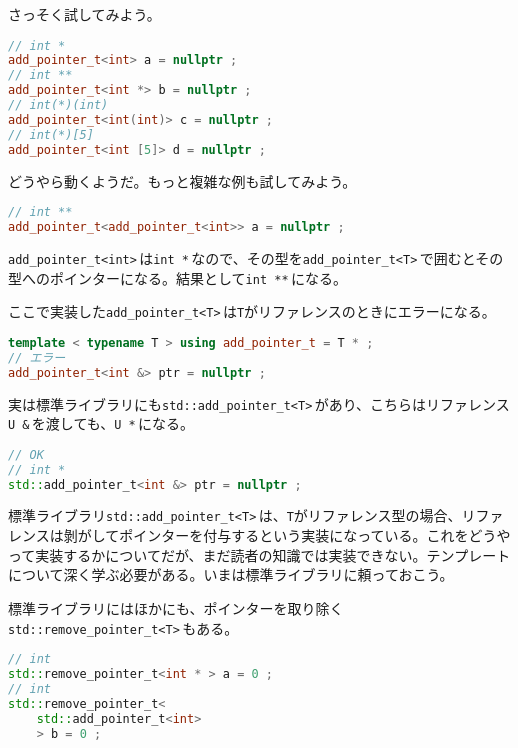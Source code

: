 さっそく試してみよう。

\begin{lstlisting}[language={C++}]
// int *
add_pointer_t<int> a = nullptr ;
// int **
add_pointer_t<int *> b = nullptr ;
// int(*)(int)
add_pointer_t<int(int)> c = nullptr ;
// int(*)[5]
add_pointer_t<int [5]> d = nullptr ;
\end{lstlisting}

どうやら動くようだ。もっと複雑な例も試してみよう。

\begin{lstlisting}[language={C++}]
// int **
add_pointer_t<add_pointer_t<int>> a = nullptr ;
\end{lstlisting}

\texttt{add\_pointer\_t<int>}\,は\texttt{int *}\,なので、その型を\texttt{add\_pointer\_t<T>}\,で囲むとその型へのポインターになる。結果として\texttt{int **}\,になる。

ここで実装した\texttt{add\_pointer\_t<T>}\,は\texttt{T}がリファレンスのときにエラーになる。

\begin{lstlisting}[language={C++}]
template < typename T > using add_pointer_t = T * ;
// エラー
add_pointer_t<int &> ptr = nullptr ;
\end{lstlisting}

実は標準ライブラリにも\texttt{std::add\_pointer\_t<T>}\,があり、こちらはリファレンス\texttt{U \&}\,を渡しても、\texttt{U *}\,になる。

\begin{lstlisting}[language={C++}]
// OK
// int *
std::add_pointer_t<int &> ptr = nullptr ;
\end{lstlisting}

標準ライブラリ\texttt{std::add\_pointer\_t<T>}\,は、\texttt{T}がリファレンス型の場合、リファレンスは剝がしてポインターを付与するという実装になっている。これをどうやって実装するかについてだが、まだ読者の知識では実装できない。テンプレートについて深く学ぶ必要がある。いまは標準ライブラリに頼っておこう。

標準ライブラリにはほかにも、ポインターを取り除く\texttt{std::remove\_pointer\_t<T>}\,もある。

\begin{lstlisting}[language={C++}]
// int
std::remove_pointer_t<int * > a = 0 ;
// int
std::remove_pointer_t<
    std::add_pointer_t<int>
    > b = 0 ;
\end{lstlisting}


